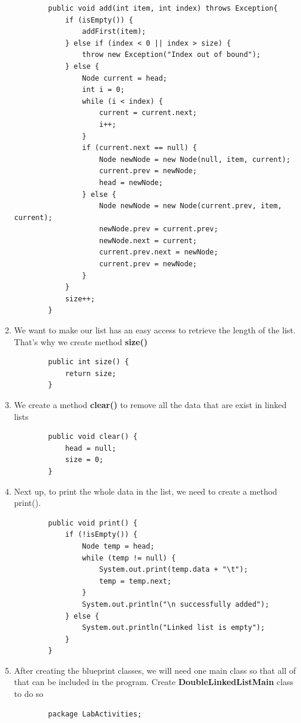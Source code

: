 \documentclass[12pt,titlepage]{article}
\begin{document}
\begin{enumerate}
    \begin{verbatim}
        public void add(int item, int index) throws Exception{
            if (isEmpty()) {
                addFirst(item);
            } else if (index < 0 || index > size) {
                throw new Exception("Index out of bound");
            } else {
                Node current = head;
                int i = 0;
                while (i < index) {
                    current = current.next;
                    i++;
                }
                if (current.next == null) {
                    Node newNode = new Node(null, item, current);
                    current.prev = newNode;
                    head = newNode;
                } else {
                    Node newNode = new Node(current.prev, item, current);
                    newNode.prev = current.prev;
                    newNode.next = current;
                    current.prev.next = newNode;
                    current.prev = newNode;
                }
            }
            size++;
        }
    \end{verbatim}
    \item We want to make our list has an easy access to retrieve the length of the list. That’s why we create method \textbf{size()}
    \begin{verbatim}
        public int size() {
            return size;
        }
    \end{verbatim}
    \item We create a method \textbf{clear()} to remove all the data that are exist in linked lists
    \begin{verbatim}
        public void clear() {
            head = null;
            size = 0;
        }
    \end{verbatim}
    \item Next up, to print the whole data in the list, we need to create a method print().
    \begin{verbatim}
        public void print() {
            if (!isEmpty()) {
                Node temp = head;
                while (temp != null) {
                    System.out.print(temp.data + "\t");
                    temp = temp.next;
                }
                System.out.println("\n successfully added");
            } else {
                System.out.println("Linked list is empty");
            }
        }
    \end{verbatim}
    \item After creating the blueprint classes, we will need one main class so that all of that can be included in the program. Create \textbf{DoubleLinkedListMain} class to do so
    \begin{verbatim}
        package LabActivities;


\end{verbatim}
\end{enumerate}
\end{document}
